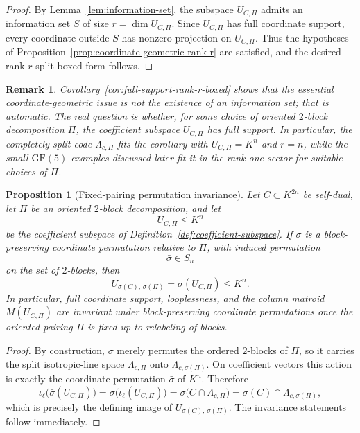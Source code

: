 \documentclass[12pt]{article}
\newtheorem{prop}[theorem]{Proposition}
\newtheorem{remark}[theorem]{Remark}
\newcommand{\GF}[1]{\ensuremath{\mathrm{GF}(#1)}}
\begin{document}
\begin{proof}
By Lemma~\ref{lem:information-set}, the subspace \(U_{C,\Pi}\) admits an information set \(S\) of size \(r=\dim U_{C,\Pi}\). Since \(U_{C,\Pi}\) has full coordinate support, every coordinate outside \(S\) has nonzero projection on \(U_{C,\Pi}\). Thus the hypotheses of Proposition~\ref{prop:coordinate-geometric-rank-r} are satisfied, and the desired rank-\(r\) split boxed form follows.
\end{proof}

\begin{remark}
\rm
Corollary~\ref{cor:full-support-rank-r-boxed} shows that the essential coordinate-geometric issue is not the existence of an information set; that is automatic. The real question is whether, for some choice of oriented \(2\)-block decomposition \(\Pi\), the coefficient subspace \(U_{C,\Pi}\) has full support. In particular, the completely split code \(\Lambda_{c,\Pi}\) fits the corollary with \(U_{C,\Pi}=K^n\) and \(r=n\), while the small \(\GF{5}\) examples discussed later fit it in the rank-one sector for suitable choices of \(\Pi\).
\end{remark}

\begin{prop}[Fixed-pairing permutation invariance]
\label{prop:fixed-pairing-permutation}
Let \(C\subset K^{2n}\) be self-dual, let \(\Pi\) be an oriented \(2\)-block decomposition, and let
\[
U_{C,\Pi}\le K^n
\]
be the coefficient subspace of Definition~\ref{def:coefficient-subspace}. If \(\sigma\) is a block-preserving coordinate permutation relative to \(\Pi\), with induced permutation
\[
\bar\sigma\in S_n
\]
on the set of \(2\)-blocks, then
\[
U_{\sigma(C),\,\sigma(\Pi)}=\bar\sigma(U_{C,\Pi})\le K^n.
\]
In particular, full coordinate support, looplessness, and the column matroid \(M(U_{C,\Pi})\) are invariant under block-preserving coordinate permutations once the oriented pairing \(\Pi\) is fixed up to relabeling of blocks.
\end{prop}

\begin{proof}
By construction, \(\sigma\) merely permutes the ordered \(2\)-blocks of \(\Pi\), so it carries the split isotropic-line space \(\Lambda_{c,\Pi}\) onto \(\Lambda_{c,\sigma(\Pi)}\). On coefficient vectors this action is exactly the coordinate permutation \(\bar\sigma\) of \(K^n\). Therefore
\[
\iota_\ell\bigl(\bar\sigma(U_{C,\Pi})\bigr)
=
\sigma\bigl(\iota_\ell(U_{C,\Pi})\bigr)
=
\sigma\bigl(C\cap \Lambda_{c,\Pi}\bigr)
=
\sigma(C)\cap \Lambda_{c,\sigma(\Pi)},
\]
which is precisely the defining image of \(U_{\sigma(C),\,\sigma(\Pi)}\). The invariance statements follow immediately.
\end{proof}
\end{document}
